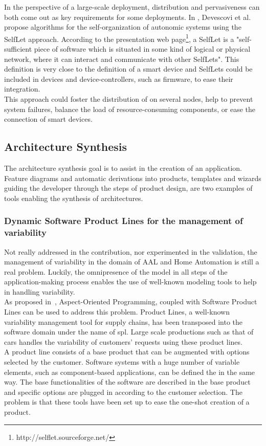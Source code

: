 In the perspective of a large-scale deployment, distribution and pervasiveness can both come out as key requirements for some deployments. In \cite{Devescovi:2007}, Devescovi et al. propose algorithms for the self-organization of autonomic systems using the SelfLet approach. According to the presentation web page\footnote{http://selflet.sourceforge.net/}, a SelfLet is a "self-sufficient piece of software which is situated in some kind of logical or physical network, where it can interact and communicate with other SelfLets". This definition is very close to the definition of a smart device and SelfLets could be included in devices and device-controllers, such as firmware, to ease their integration.\\
This approach could foster the distribution of \enti{} on several nodes, help to prevent system failures, balance the load of resource-consuming components, or ease the connection of smart devices.


\subsection{Architecture Synthesis}
\label{sec:archiSynth}

The architecture synthesis goal is to assist in the creation of an application. Feature diagrams and automatic derivations into products, templates and wizards guiding the developer through the steps of product design, are two examples of tools enabling the synthesis of architectures.

\subsubsection{Dynamic Software Product Lines for the management of variability}

Not really addressed in the contribution, nor experimented in the validation, the management of variability in the domain of AAL and Home Automation is still a real problem. Luckily, the omnipresence of the model in all steps of the application-making process enables the use of well-known modeling tools to help in handling variability.\\

As proposed in~\cite{Morin:2010}, Aspect-Oriented Programming, coupled with Software Product Lines can be used to address this problem. Product Lines, a well-known variability management tool for supply chains, has been transposed into the software domain under the name of \gls{spl}. Large scale productions such as that of cars handles the variability of customers' requests using these product lines.\\
A product line consists of a base product that can be augmented with options selected by the customer. Software systems with a huge number of variable elements, such as component-based applications, can be defined the in the same way. The base functionalities of the software are described in the base product and specific options are plugged in according to the customer selection. The problem is that these tools have been set up to ease the one-shot creation of a product.\\

